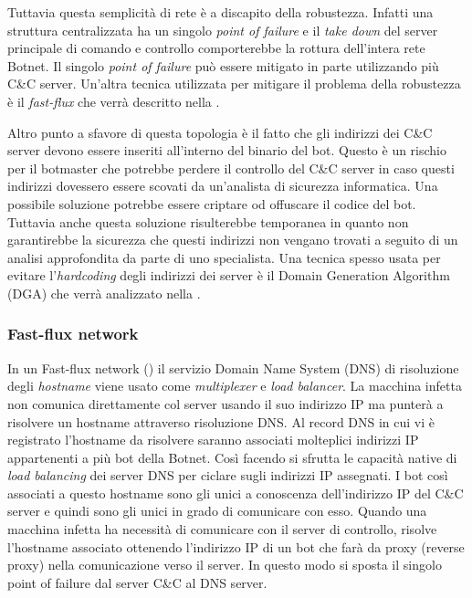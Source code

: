 Tuttavia questa semplicità di rete è a discapito della robustezza. Infatti una struttura centralizzata ha un singolo \textit{point of failure} e il \textit{take down} del server principale di comando e controllo comporterebbe la rottura dell'intera rete Botnet. 
Il singolo \textit{point of failure} può essere mitigato in parte utilizzando più C\&C server.
Un'altra tecnica utilizzata per mitigare il problema della robustezza è il \textit{fast-flux} che verrà descritto nella .

Altro punto a sfavore di questa topologia è il fatto che gli indirizzi dei C\&C server devono essere inseriti all'interno del binario del bot. Questo è un rischio per il botmaster che potrebbe perdere il controllo del C\&C server in caso questi indirizzi dovessero essere scovati da un'analista di sicurezza informatica.
Una possibile soluzione potrebbe essere criptare od offuscare il codice del bot. Tuttavia anche questa soluzione risulterebbe temporanea in quanto non garantirebbe la sicurezza che questi indirizzi non vengano trovati a seguito di un analisi approfondita da parte di uno specialista.
Una tecnica spesso usata per evitare l'\textit{hardcoding} degli indirizzi dei server è il Domain Generation Algorithm (DGA) che verrà analizzato nella .

\subsubsection{Fast-flux network}
\label{fast-flux-network-label}
In un Fast-flux network () il servizio Domain Name System (DNS) di risoluzione degli \textit{hostname} viene usato come \textit{multiplexer} e \textit{load balancer}. La macchina infetta non comunica direttamente col server usando il suo indirizzo IP ma punterà a risolvere un hostname attraverso risoluzione DNS. Al record DNS in cui vi è registrato l'hostname da risolvere saranno associati molteplici indirizzi IP appartenenti a più bot della Botnet. Così facendo si sfrutta le capacità native di \textit{load balancing} dei server DNS per ciclare sugli indirizzi IP assegnati. I bot così associati a questo hostname sono gli unici a conoscenza dell'indirizzo IP del C\&C server e quindi sono gli unici in grado di comunicare con esso. 
Quando una macchina infetta ha necessità di comunicare con il server di controllo, risolve l'hostname associato ottenendo l'indirizzo IP di un bot che farà da proxy (reverse proxy) nella comunicazione verso il server.
In questo modo  si sposta il singolo point of failure dal server C\&C al DNS server.

